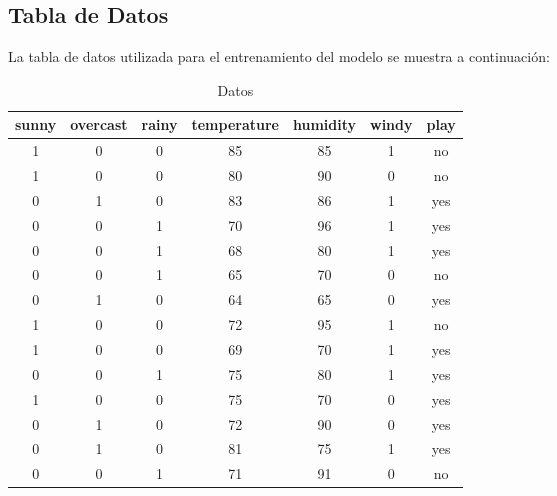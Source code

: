 \subsection{Tabla de Datos} \label{subsec:Tabla de Datos}

La tabla de datos utilizada para el entrenamiento del modelo se muestra a continuación:

\begin{table}[ht]
    \centering
    \caption{Datos}
    \label{tab:datos}
    \begin{tabular}{|c|c|c|c|c|c|c|}
    \hline
    sunny & overcast & rainy & temperature & humidity & windy & play \\
    \hline
    1 & 0 & 0 & 85 & 85 & 1 & no \\
    1 & 0 & 0 & 80 & 90 & 0 & no \\
    0 & 1 & 0 & 83 & 86 & 1 & yes \\
    0 & 0 & 1 & 70 & 96 & 1 & yes \\
    0 & 0 & 1 & 68 & 80 & 1 & yes \\
    0 & 0 & 1 & 65 & 70 & 0 & no \\
    0 & 1 & 0 & 64 & 65 & 0 & yes \\
    1 & 0 & 0 & 72 & 95 & 1 & no \\
    1 & 0 & 0 & 69 & 70 & 1 & yes \\
    0 & 0 & 1 & 75 & 80 & 1 & yes \\
    1 & 0 & 0 & 75 & 70 & 0 & yes \\
    0 & 1 & 0 & 72 & 90 & 0 & yes \\
    0 & 1 & 0 & 81 & 75 & 1 & yes \\
    0 & 0 & 1 & 71 & 91 & 0 & no \\
    \hline
    \end{tabular}
\end{table}
